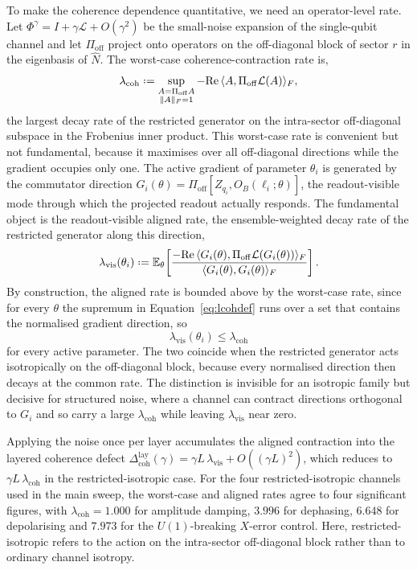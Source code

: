 \documentclass[10pt,a4paper]{amsart}
\newcommand{\lcoh}{\lambda_{\mathrm{coh}}}
\newcommand{\lvis}{\lambda_{\mathrm{vis}}}
\newcommand{\Lop}{\mathcal{L}}
\newcommand{\Pioff}{\Pi_{\mathrm{off}}}
\newcommand{\Dcohlay}{\Delta_{\mathrm{coh}}^{\mathrm{lay}}}
\newcommand{\eqdef}{\mathrel{\vcenter{\baselineskip0.5ex \lineskiplimit0pt
  \hbox{\scriptsize.}\hbox{\scriptsize.}}}=}
\begin{document}
To make the coherence dependence quantitative, we need an operator-level rate. Let $\Phi^\gamma=I+\gamma\Lop+O(\gamma^2)$ be the small-noise expansion of the single-qubit channel and let $\Pioff$ project onto operators on the off-diagonal block of sector $r$ in the eigenbasis of $\hat N$. The worst-case coherence-contraction rate is,
\begin{equation}
    \lcoh
    \eqdef
    \sup_{\substack{A=\Pioff A\\ \|A\|_F=1}}
    -\mathrm{Re}\,\langle A,\Pioff\Lop(A)\rangle_F ,
    \label{eq:lcohdef}
\end{equation}
the largest decay rate of the restricted generator on the intra-sector off-diagonal subspace in the Frobenius inner product. This worst-case rate is convenient but not fundamental, because it maximises over all off-diagonal directions while the gradient occupies only one. The active gradient of parameter $\theta_i$ is generated by the commutator direction $G_i(\theta)=\Pioff[Z_{q_i},O_B(\ell_i;\theta)]$, the readout-visible mode through which the projected readout actually responds. The fundamental object is the readout-visible aligned rate, the ensemble-weighted decay rate of the restricted generator along this direction,
\begin{equation}
    \lvis(\theta_i)
    \eqdef
    \mathbb{E}_{\theta}\!\left[
    \frac{-\mathrm{Re}\,\langle G_i(\theta),\Pioff\Lop(G_i(\theta))\rangle_F}
         {\langle G_i(\theta),G_i(\theta)\rangle_F}
    \right].
    \label{eq:lvisdef}
\end{equation}
By construction, the aligned rate is bounded above by the worst-case rate, since for every $\theta$ the supremum in Equation~\eqref{eq:lcohdef} runs over a set that contains the normalised gradient direction, so
\begin{equation}
    \lvis(\theta_i)\leq\lcoh
    \label{eq:visbound}
\end{equation}
for every active parameter. The two coincide when the restricted generator acts isotropically on the off-diagonal block, because every normalised direction then decays at the common rate. The distinction is invisible for an isotropic family but decisive for structured noise, where a channel can contract directions orthogonal to $G_i$ and so carry a large $\lcoh$ while leaving $\lvis$ near zero.

Applying the noise once per layer accumulates the aligned contraction into the layered coherence defect $\Dcohlay(\gamma)=\gamma L\,\lvis+O((\gamma L)^2)$, which reduces to $\gamma L\,\lcoh$ in the restricted-isotropic case. For the four restricted-isotropic channels used in the main sweep, the worst-case and aligned rates agree to four significant figures, with $\lcoh=1.000$ for amplitude damping, $3.996$ for dephasing, $6.648$ for depolarising and $7.973$ for the $U(1)$-breaking $X$-error control. Here, restricted-isotropic refers to the action on the intra-sector off-diagonal block rather than to ordinary channel isotropy.
\end{document}
